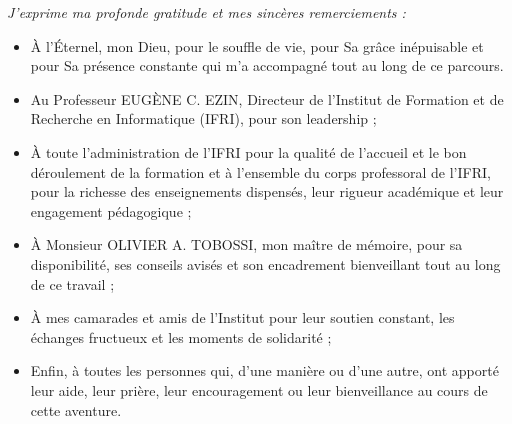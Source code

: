 \remerciements

\textit{J’exprime ma profonde gratitude et mes sincères remerciements :}

\begin{itemize}[label=\textbullet, leftmargin=1.5cm, labelsep=0.5cm, itemsep=1em]
    \item À l’Éternel, mon Dieu, pour le souffle de vie, pour Sa grâce inépuisable et pour Sa présence constante qui m’a accompagné tout au long de ce parcours.
    \item Au Professeur EUGÈNE C. EZIN, Directeur de l’Institut de Formation et de Recherche en Informatique (IFRI), pour son leadership ;
    \item À toute l’administration de l’IFRI pour la qualité de l’accueil et le bon déroulement de la formation et à l’ensemble du corps professoral de l’IFRI, pour la richesse des enseignements dispensés, leur rigueur académique et leur engagement pédagogique ;
    \item À Monsieur OLIVIER A. TOBOSSI, mon maître de mémoire, pour sa disponibilité, ses conseils avisés et son encadrement bienveillant tout au long de ce travail ;
    \item À mes camarades et amis de l’Institut pour leur soutien constant, les échanges fructueux et les moments de solidarité ;
    \item Enfin, à toutes les personnes qui, d’une manière ou d’une autre, ont apporté leur aide, leur prière, leur encouragement ou leur bienveillance au cours de cette aventure.
\end{itemize}
